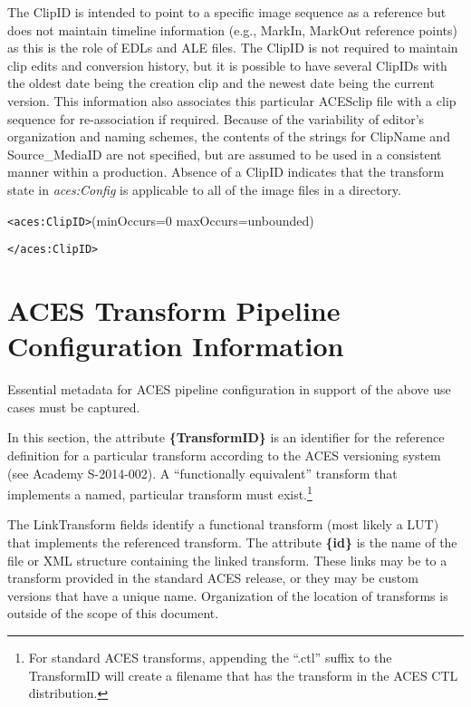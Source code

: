The ClipID is intended to point to a specific image sequence as a reference but does not maintain timeline information (e.g., MarkIn, MarkOut reference points) as this is the role of EDLs and ALE files. The ClipID is not required to maintain clip edits and conversion history, but it is possible to have several ClipIDs with the oldest date being the creation clip and the newest date being the current version. This information also associates this particular ACESclip file with a clip sequence for re-association if required. Because of the variability of editor's organization and naming schemes, the contents of the strings for ClipName and Source\_MediaID are not specified, but are assumed to be used in a consistent manner within a production. Absence of a ClipID indicates that the transform state in \textit{aces:Config} is applicable to all of the image files in a directory.

\texttt{<aces:ClipID>}\tabto{1.5in}(minOccurs=0 maxOccurs=unbounded)


\texttt{</aces:ClipID>}

\section{ACES Transform Pipeline Configuration Information}
Essential metadata for ACES pipeline configuration in support of the above use cases must be captured.

In this section, the attribute \textbf{\{TransformID\}} is an identifier for the reference definition for a particular transform according to the ACES versioning system (see Academy S-2014-002). A ``functionally equivalent'' transform that implements a named, particular transform must exist.\footnote{For standard ACES transforms, appending the ``.ctl'' suffix to the TransformID will create a filename that has the transform in the ACES CTL distribution.}

The LinkTransform fields identify a functional transform (most likely a LUT) that implements the referenced transform.  The attribute \textbf{\{id\}} is the name of the file or XML structure containing the linked transform. These links may be to a transform provided in the standard ACES release, or they may be custom versions that have a unique name. Organization of the location of transforms is outside of the scope of this document.

